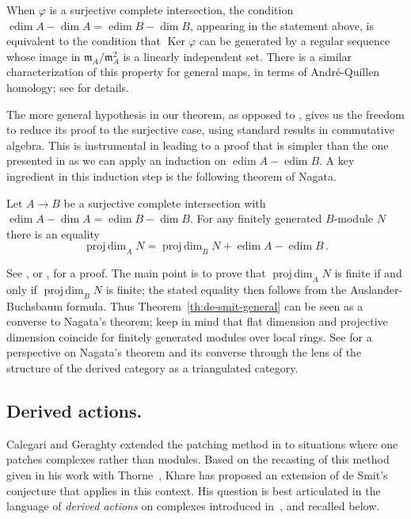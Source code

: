 \documentclass[twoside,leqno]{article}
\newcommand{\edim}{\operatorname{edim}}
\newcommand{\fm}{{\mathfrak m}}
\newcommand{\Ker}{\operatorname{Ker}}
\newcommand{\pdim}{\operatorname{proj\,dim}}
\begin{document}
 When $\varphi$ is a surjective complete intersection, the condition $\edim A-\dim A=\edim B-\dim B$, appearing in the statement above, is equivalent to the condition that $\Ker \varphi$ can be generated by a regular sequence whose image in  $\fm_A/\fm_A^2$ is a linearly independent set. There is a similar characterization of this property for general maps, in terms of Andr\'e-Quillen homology; see \cite{Brochard/Iyengar/Khare:2023a} for details. 

The  more general  hypothesis  in our theorem,  as opposed to \cite[Theorem 1.1]{Brochard:2017}, gives us the freedom to reduce its proof to the surjective case, using standard results in commutative algebra. This  is instrumental in leading to a proof that is simpler than  the one presented in \cite{Brochard:2017} as we can  apply an induction on $\edim A - \edim B$. A key ingredient in this induction step is the following theorem of Nagata.

\begin{theorem}
\label{th:nagata}
Let $A\to B$ be a surjective complete intersection with $\edim A-\dim A=\edim B-\dim B$. For any finitely generated $B$-module $N$ there is an equality
\[
\pdim_A N = \pdim_B N + \edim A - \edim B\,.
\]
\end{theorem}
See \cite[Corollary (27.5)]{Nagata:1962a}, or \cite[Proposition~3.3.5(1)]{Avramov:1998a}, for a proof. The main point is to prove that $\pdim_AN$ is finite if and only if $\pdim_BN$ is finite; the stated equality then follows from the Auslander-Buchsbaum formula.  Thus  Theorem~\ref{th:de-smit-general} can be seen as a converse to Nagata's theorem; keep in mind that flat dimension and projective dimension coincide for finitely generated modules over local rings.  See \cite{Iyengar/Letz/Liu/Pollitz:2022} for a perspective on Nagata's theorem and its converse through the lens of the structure of the derived category as a triangulated category.

\subsection*{Derived actions.}
Calegari and Geraghty \cite{Calegari/Geraghty:2018} extended the patching method  in  \cite{Taylor/Wiles:1995} to situations where one patches complexes rather than modules.  Based on the recasting of this method given in his work with Thorne~\cite{Khare/Thorne:2017}, Khare has proposed an extension of de Smit's conjecture that applies in this context. His question is best articulated in the language of \emph{derived actions} on complexes introduced in~\cite{Khare/Thorne:2017}, and recalled below.
\end{document}
